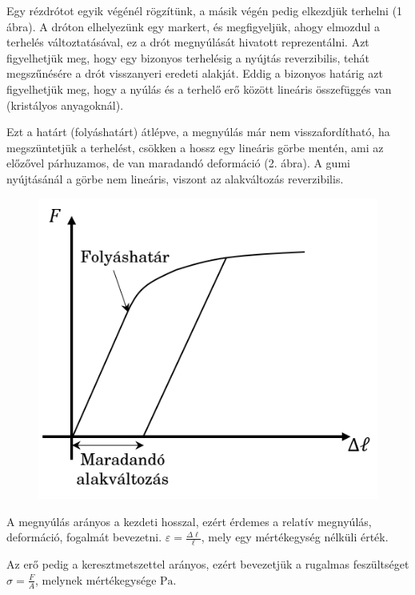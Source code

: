 \documentclass[a4paper, 12pt]{article}
\begin{document}
        Egy rézdrótot egyik végénél rögzítünk, a másik végén pedig elkezdjük terhelni (1 ábra). A dróton         elhelyezünk egy markert, és megfigyeljük, ahogy elmozdul a terhelés változtatásával, ez a drót megnyúlását hivatott reprezentálni. Azt figyelhetjük meg, hogy egy bizonyos terhelésig a nyújtás reverzibilis, tehát megszűnésére a drót visszanyeri eredeti alakját. Eddig a bizonyos határig azt figyelhetjük meg, hogy a nyúlás és a terhelő erő között lineáris összefüggés van (kristályos anyagoknál). 
        
        Ezt a határt (folyáshatárt) átlépve, a megnyúlás már nem visszafordítható, ha megszüntetjük a terhelést, csökken a hossz egy lineáris görbe mentén, ami az előzővel párhuzamos, de van maradandó deformáció (2. ábra). A gumi nyújtásánál a görbe nem lineáris, viszont az alakváltozás reverzibilis.
        
\begin{figure}[h]
\centering
\includegraphics[scale=0.5]{tetel1_2.png}
\caption{}
\end{figure}

A megnyúlás arányos a kezdeti hosszal, ezért érdemes a relatív megnyúlás, deformáció, fogalmát bevezetni. $\varepsilon=\frac{\Delta\ell}{\ell}$, mely egy mértékegység nélküli érték. 

Az erő pedig a keresztmetszettel arányos, ezért bevezetjük a rugalmas feszültséget $\sigma=\frac{F}{A}$, melynek mértékegysége $\mathrm{Pa}$. 
\end{document}
